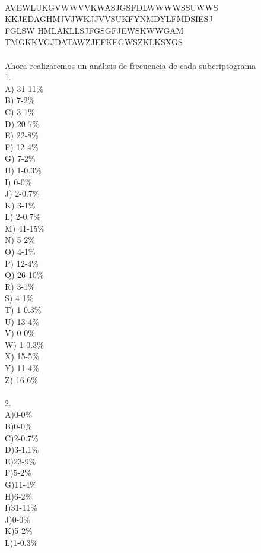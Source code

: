 \documentclass[letterpaper,10pt]{article}
\begin{document}
\begin{enumerate}
\begin{enumerate}
\\AVEWLUKGVWWVVKWASJGSFDLWWWWSSUWWS\\KKJEDAGHMJVJWKJJVVSUKFYNMDYLFMDSIESJ\\FGLSW
HMLAKLLSJFGSGFJEWSKWWGAM\\TMGKKVGJDATAWZJEFKEGWSZKLKSXGS\\\\
Ahora realizaremos un análisis de frecuencia de cada subcriptograma\\
1.\\
A) 31-11\% \\
B) 7-2\% \\
C) 3-1\% \\
D) 20-7\% \\
E) 22-8\% \\
F) 12-4\% \\
G) 7-2\% \\
H) 1-0.3\% \\
I) 0-0\% \\
J) 2-0.7\% \\
K) 3-1\% \\
L) 2-0.7\% \\
M) 41-15\% \\
N) 5-2\% \\
O) 4-1\% \\
P) 12-4\% \\
Q) 26-10\% \\
R) 3-1\% \\
S) 4-1\% \\
T) 1-0.3\% \\
U) 13-4\% \\
V) 0-0\% \\
W) 1-0.3\% \\
X) 15-5\% \\
Y) 11-4\% \\
Z) 16-6\% \\\\
2.\\
A)0-0\% \\
B)0-0\% \\
C)2-0.7\% \\
D)3-1.1\% \\
E)23-9\% \\
F)5-2\% \\
G)11-4\% \\
H)6-2\% \\
I)31-11\% \\
J)0-0\% \\
K)5-2\% \\
L)1-0.3\% \\

\end{enumerate}
\end{enumerate}
\end{document}
